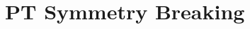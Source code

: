 \documentclass{iopart}
\begin{document}
	
%	
%	
%	
%	
%	



	

\appendix



\section{PT Symmetry Breaking}
\end{document}
